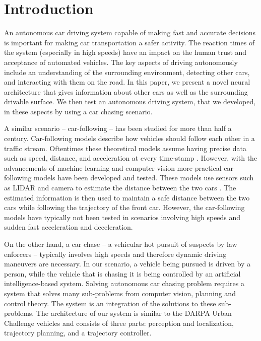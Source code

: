 \documentclass{ctuthesis/ctuthesis}
\begin{document}
\maketitle

\chapter{Introduction}
An autonomous car driving system capable of making fast and accurate decisions is important for making car transportation a safer activity. The reaction times of the system (especially in high speeds) have an impact on the human trust and acceptance of automated vehicles. The key aspects of driving autonomously include an understanding of the surrounding environment, detecting other cars, and interacting with them on the road. In this paper, we present a novel neural architecture that gives information about other cars as well as the surrounding drivable surface. We then test an autonomous driving system, that we developed, in these aspects by using a car chasing scenario. \par


A similar scenario -- car-following -- has been studied for more than half a century. Car-following models describe how vehicles should follow each other in a traffic stream. Oftentimes these theoretical models assume having precise data such as speed, distance, and acceleration at every time-stamp \cite{car_following}. However, with the advancements of machine learning and computer vision more practical car-following models have been developed and tested. These models use sensors such as LIDAR and camera to estimate the distance between the two cars \cite{lidar_highway}. The estimated information is then used to maintain a safe distance between the two cars while following the trajectory of the front car. However, the car-following models have typically not been tested in scenarios involving high speeds and sudden fast acceleration and deceleration. \par
 
 
On the other hand, a car chase -- a vehicular hot pursuit of suspects by law enforcers -- typically involves high speeds and therefore dynamic driving maneuvers are necessary. In our scenario, a vehicle being pursued is driven by a person, while the vehicle that is chasing it is being controlled by an artificial intelligence-based system. Solving autonomous car chasing problem requires a system that solves many sub-problems from computer vision, planning and control theory. The system is an integration of the solutions to these sub-problems. The architecture of our system is similar to the DARPA Urban Challenge vehicles \cite{Bertha,darpa2,darpa_book} and consists of three parts: perception and localization, trajectory planning, and a trajectory controller. \par
\end{document}
